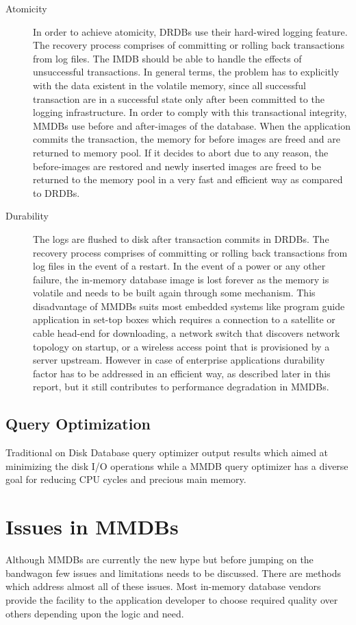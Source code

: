 \documentclass[12pt]{article} %
\begin{document}
\begin{description}
\item[Atomicity] In order to achieve atomicity, DRDBs use their hard-wired logging feature. The recovery process comprises of committing or rolling back transactions from log files. The IMDB should be able to handle the effects of unsuccessful transactions. In general terms, the problem has to explicitly with the data existent in the volatile memory, since all successful transaction are in a successful state only after been committed to the logging infrastructure. In order to comply with this transactional integrity, MMDBs use before and after-images of the database. When the application commits the transaction, the memory for before images are freed and are returned to memory pool. If it decides to abort due to any reason, the before-images are restored and newly inserted images are freed to be returned to the memory pool in a very fast and efficient way as compared to DRDBs.

\item[Durability] The logs are flushed to disk after transaction commits in DRDBs. The recovery process comprises of committing or rolling back transactions from log files in the event of a restart. In the event of a power or any other failure, the in-memory database image is lost forever as the memory is volatile and needs to be built again through some mechanism. This disadvantage of MMDBs suits most embedded systems like program guide application in set-top boxes which requires a connection to a satellite or cable head-end for downloading, a network switch that discovers network topology on startup, or a wireless access point that is provisioned by a server upstream. However in case of enterprise applications durability factor has to be addressed in an efficient way, as described later in this report, but it still contributes to performance degradation in MMDBs.
\end{description}

\subsection{Query Optimization}
Traditional on Disk Database query optimizer output results which aimed at minimizing the disk I/O operations while a MMDB query optimizer has a diverse goal for reducing CPU cycles and precious main memory. 

\section{Issues in MMDBs}
Although MMDBs are currently the new hype but before jumping on the bandwagon few issues and limitations needs to be discussed. There are methods which address almost all of these issues. Most in-memory database vendors provide the facility to the application developer to choose required quality over others depending upon the logic and need. 
\end{document}

